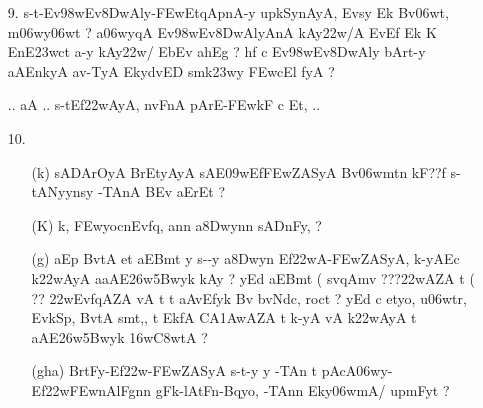 \def\DevnagVersion{2.15}\documentclass{article}
\begin{document}
\begin{itemize}
\begin{itemize}
              \item[gha.] {\dn idAnFtnFnA\2 BrtFyBqAZA t\3CEwtrA@yyn-y t\? s\2-t aAv-yE\3CBwqy(v\?n EnyoQytA ahA\0Et{\rs ,\re} iEt aE-t Ek\2 BvtA aEBmt {\rs ?\re}}
                            
            \end{itemize}
 
 \item[9.] {\dn s\2-t{\rs -\re}Ev\398wEv\38DwAly{\rs -\re}\3FEwEtqApnA-y upkSynAyA, Evsy\? Ek\2 Bv\306wt, m\306wy\306wt\? {\rs ?\re} a\306wy\?qA\2 Ev\398wEv\38DwAlyAnA\2 kAy\0\322w/A  EvEf\2 Ek\2  K EnE\323wct a-y kAy\0\322w\?/\2 EbEv ah\0Eg {\rs ?\re} h\0f\2 c Ev\398wEv\38DwAly\2 bArt-y aAEnkyA av-TyA EkydvED smk\323wy\2 \3FEwcEl\2 fyA {\rs ?\re}} 
   
   {\dn .. aA .. s\2-tEf\322wAyA, nvFnA pArE-\3FEwkF c Et, ..}


\item[10.] \begin{itemize}
            \item[({\dn k})] {\dn sA\2DArOyA\2 BrEtyAyA\2 sAE\309wEf\3FEwZASyA\2 Bv\306wmt\?n kF{\rs ??\re}f\2 s\2-tANyynsy -TAnA\2  BEv aErEt {\rs ?\re}}
            
            \item[({\dn K})] {\dn k, \3FEwyocnEvf\?q, an\?n a\38Dwyn\?n sADnFy, {\rs ?\re}}
            
            \item[({\dn g})] {\dn aEp BvtA et aEBmt y s\2--y a\38Dwyn\2 Ef\322wA{\rs -\re}\3FEwZASyA, k-yA\2Ec k\322wAyA aaAE\326w\35Bwyk\2 kAy\0 {\rs ?\re} yEd aEBmt {\rs (\re} sv\4qAm\?v {\rs ???\re}\322wAZA\2 t\?{\rs ,\re} {\rs (\re}  {\rs ??\re} \322wEvf\?qAZA\2 vA t\?{\rs ,\re} t aAvEfyk\2 Bv bvNdc, roc\?t {\rs ?\re} yEd c etyo, u\306wtr, EvkSp, BvtA\2 s\2mt,{\rs ,\re} t EkfA\2 CA\31AwAZA t\?{\rs ,\re} k-yA\2 vA k\322wAyA\2{\rs ,\re} t aAE\326w\35Bwyk\2 \316w\3C8wtA {\rs ?\re}} 
            
            \item[(\dn gha)] {\dn BrtFy{\rs -\re}Ef\322w{\rs -\re}\3FEwZASyA\2 s\2-t-y y -TAn t pAcA\306wy{\rs -\re}Ef\322w\3FEwnAlFgn\?n g\5Fk{\rs -\re}lAtFn{\rs -\re}Bqyo, -TAn\?n Eky\306wmA/ upmFy\?t {\rs ?\re}}                    
            \end{itemize}    


\end{itemize}
\end{document}
